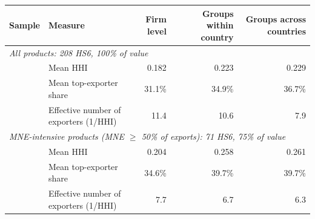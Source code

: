 \begin{tabular}{llrrr}
\toprule
Sample & Measure & Firm level & Groups within country & Groups across countries \\
\midrule
\multicolumn{5}{l}{\textit{All products: 208 HS6, 100\% of value}} \\
 & Mean HHI & 0.182 & 0.223 & 0.229 \\
 & Mean top-exporter share & 31.1\% & 34.9\% & 36.7\% \\
 & Effective number of exporters (1/HHI) & 11.4 & 10.6 & 7.9 \\
\multicolumn{5}{l}{\textit{MNE-intensive products (MNE $\geq$ 50\% of exports): 71 HS6, 75\% of value}} \\
 & Mean HHI & 0.204 & 0.258 & 0.261 \\
 & Mean top-exporter share & 34.6\% & 39.7\% & 39.7\% \\
 & Effective number of exporters (1/HHI) & 7.7 & 6.7 & 6.3 \\
\bottomrule
\end{tabular}
